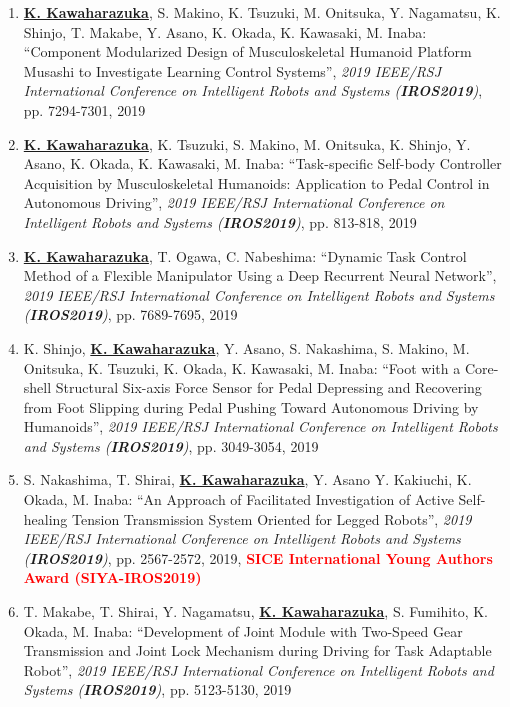 \documentclass[letterpaper]{article}
\begin{document}
\begin{enumerate}
\item \underline{\textbf{K. Kawaharazuka}}, S. Makino, K. Tsuzuki, M. Onitsuka, Y. Nagamatsu, K. Shinjo, T. Makabe, Y. Asano, K. Okada, K. Kawasaki, M. Inaba: ``Component Modularized Design of Musculoskeletal Humanoid Platform Musashi to Investigate Learning Control Systems'', \textit{2019 IEEE/RSJ International Conference on Intelligent Robots and Systems (\textit{\textbf{IROS2019}})}, pp. 7294-7301, 2019
\item \underline{\textbf{K. Kawaharazuka}}, K. Tsuzuki, S. Makino, M. Onitsuka, K. Shinjo, Y. Asano, K. Okada, K. Kawasaki, M. Inaba: ``Task-specific Self-body Controller Acquisition by Musculoskeletal Humanoids: Application to Pedal Control in Autonomous Driving'', \textit{2019 IEEE/RSJ International Conference on Intelligent Robots and Systems (\textit{\textbf{IROS2019}})}, pp. 813-818, 2019
\item \underline{\textbf{K. Kawaharazuka}}, T. Ogawa, C. Nabeshima: ``Dynamic Task Control Method of a Flexible Manipulator Using a Deep Recurrent Neural Network'', \textit{2019 IEEE/RSJ International Conference on Intelligent Robots and Systems (\textit{\textbf{IROS2019}})}, pp. 7689-7695, 2019
\item K. Shinjo, \underline{\textbf{K. Kawaharazuka}}, Y. Asano, S. Nakashima, S. Makino, M. Onitsuka, K. Tsuzuki, K. Okada, K. Kawasaki, M. Inaba: ``Foot with a Core-shell Structural Six-axis Force Sensor for Pedal Depressing and Recovering from Foot Slipping during Pedal Pushing Toward Autonomous Driving by Humanoids'', \textit{2019 IEEE/RSJ International Conference on Intelligent Robots and Systems (\textit{\textbf{IROS2019}})}, pp. 3049-3054, 2019
\item S. Nakashima, T. Shirai, \underline{\textbf{K. Kawaharazuka}}, Y. Asano Y. Kakiuchi, K. Okada, M. Inaba: ``An Approach of Facilitated Investigation of Active Self-healing Tension Transmission System Oriented for Legged Robots'', \textit{2019 IEEE/RSJ International Conference on Intelligent Robots and Systems (\textit{\textbf{IROS2019}})}, pp. 2567-2572, 2019, \textbf{\textcolor{red}{SICE International Young Authors Award (SIYA-IROS2019)}}
\item T. Makabe, T. Shirai, Y. Nagamatsu, \underline{\textbf{K. Kawaharazuka}}, S. Fumihito, K. Okada, M. Inaba: ``Development of Joint Module with Two-Speed Gear Transmission and Joint Lock Mechanism during Driving for Task Adaptable Robot'', \textit{2019 IEEE/RSJ International Conference on Intelligent Robots and Systems (\textit{\textbf{IROS2019}})}, pp. 5123-5130, 2019

\end{enumerate}
\end{document}
